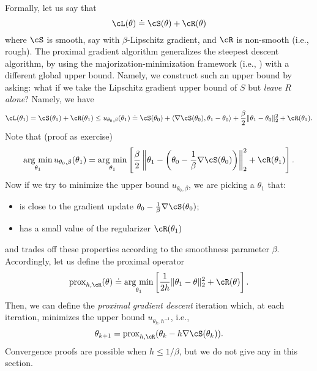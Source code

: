 \documentclass[../../book-main.tex]{subfiles}
\begin{document}
Formally, let us say that 
\begin{equation}
    \cL(\theta) \doteq \cS(\theta) + \cR(\theta)
\end{equation}
where \(\cS\) is smooth, say with \(\beta\)-Lipschitz gradient, and \(\cR\) is non-smooth (i.e., rough). The proximal gradient algorithm generalizes the steepest descent algorithm, by using the majorization-minimization framework (i.e., ) with a different global upper bound. Namely, we construct such an upper bound by asking: what if we take the Lipschitz gradient upper bound of \(S\) but \textit{leave \(R\) alone}?  Namely, we have 
\begin{equation}
    \cL(\theta_{1}) = \cS(\theta_{1}) + \cR(\theta_{1}) \leq u_{\theta_{0}, \beta}(\theta_{1}) \doteq \cS(\theta_{0}) + \ip{\nabla \cS(\theta_{0})}{\theta_{1} - \theta_{0}} + \frac{\beta}{2}\norm{\theta_{1} - \theta_{0}}_{2}^{2} + \cR(\theta_{1}).
\end{equation}
Note that (proof as exercise)
\begin{equation}
    \argmin_{\theta_{1}}u_{\theta_{0}, \beta}(\theta_{1}) = \argmin_{\theta_{1}}\bs{\frac{\beta}{2}\norm*{\theta_{1} - \bp{\theta_{0} - \frac{1}{\beta}\nabla \cS(\theta_{0})}}_{2}^{2} + \cR(\theta_{1})}.
\end{equation}
Now if we try to minimize the upper bound \(u_{\theta_{0}, \beta}\), we are picking a \(\theta_{1}\) that:
\begin{itemize}
    \item is close to the gradient update \(\theta_{0} - \frac{1}{\beta}\nabla \cS(\theta_{0})\);
    \item has a small value of the regularizer \(\cR(\theta_{1})\)
\end{itemize}
and trades off these properties according to the smoothness parameter \(\beta\). Accordingly, let us define the proximal operator
\begin{equation}
    \prox_{h, \cR}(\theta) \doteq \argmin_{\theta_{1}}\bs{\frac{1}{2h}\norm{\theta_{1} - \theta}_{2}^{2} + \cR(\theta)}.
\end{equation}
Then, we can define the \textit{proximal gradient descent} iteration which, at each iteration, minimizes the upper bound \(u_{\theta_{k}, h^{-1}}\), i.e.,
\begin{equation}
    \theta_{k + 1} = \prox_{h, \cR}(\theta_{k} - h\nabla \cS(\theta_{k})).
\end{equation}
Convergence proofs are possible when \(h \leq 1/\beta\), but we do not give any in this section.
\end{document}
